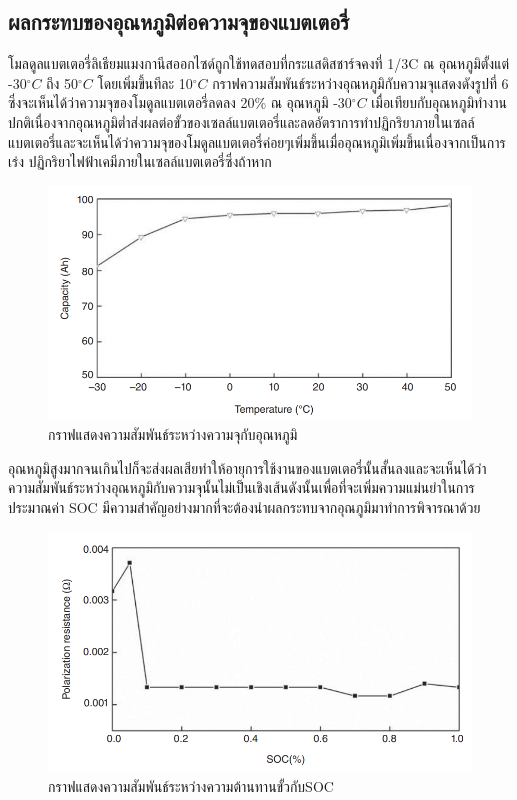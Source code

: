 \subsection{ผลกระทบของอุณหภูมิต่อความจุของแบตเตอรี่}
โมลดูลแบตเตอรี่ลิเธียมแมงกานีสออกไซด์ถูกใช้ทดสอบที่กระแสดิสชาร์จคงที่ 1/3C ณ อุณหภูมิตั้งแต่ -30$^{\circ}C$ ถึง 50$^{\circ}C$ โดยเพิ่มขึ้นทีละ 10$^{\circ}C$  กราฟความสัมพันธ์ระหว่างอุณหภูมิกับความจุแสดงดังรูปที่ 6 ซึ่งจะเห็นได้ว่าความจุของโมดูลแบตเตอรี่ลดลง 20\% ณ อุณหภูมิ -30$^{\circ}C$ เมื่อเทียบกับอุณหภูมิทำงานปกติเนื่องจากอุณหภูมิต่ำส่งผลต่อขั้วของเซลล์แบตเตอรี่และลดอัตราการทำปฏิกริยาภายในเซลล์แบตเตอรี่และจะเห็นได้ว่าความจุของโมดูลแบตเตอรี่ค่อยๆเพิ่มขึ้นเมื่ออุณหภูมิเพิ่มขึ้นเนื่องจากเป็นการเร่ง
ปฏิกริยาไฟฟ้าเคมีภายในเซลล์แบตเตอรี่ซึ่งถ้าหาก\newline
\begin{center}
	\begin{figure}[H]
		\includegraphics[width=0.6\linewidth]{Chapters/img/Current_vs_Temp.png}
			\centering
			\captionsetup{justification=centering,margin=2cm}
			\caption{กราฟแสดงความสัมพันธ์ระหว่างความจุกับอุณหภูมิ}
	\end{figure}
\end{center}
อุณหภูมิสูงมากจนเกินไปก็จะส่งผลเสียทำให้อายุการใช้งานของแบตเตอรี่นั้นสั้นลงและจะเห็นได้ว่าความสัมพันธ์ระหว่างอุณหภูมิกับความจุนั้นไม่เป็นเชิงเส้นดังนั้นเพื่อที่จะเพิ่มความแม่นยำในการประมาณค่า SOC มีความสำคัญอย่างมากที่จะต้องนำผลกระทบจากอุณภูมิมาทำการพิจารณาด้วย\newline
\begin{center}
	\begin{figure}[H]
		\includegraphics[width=0.6\linewidth]{Chapters/img/Pol_Resistance_vs_SOC.png}
			\centering
			\captionsetup{justification=centering,margin=2cm}
			\caption{กราฟแสดงความสัมพันธ์ระหว่างความต้านทานขั้วกับSOC}
	\end{figure}
\end{center}
